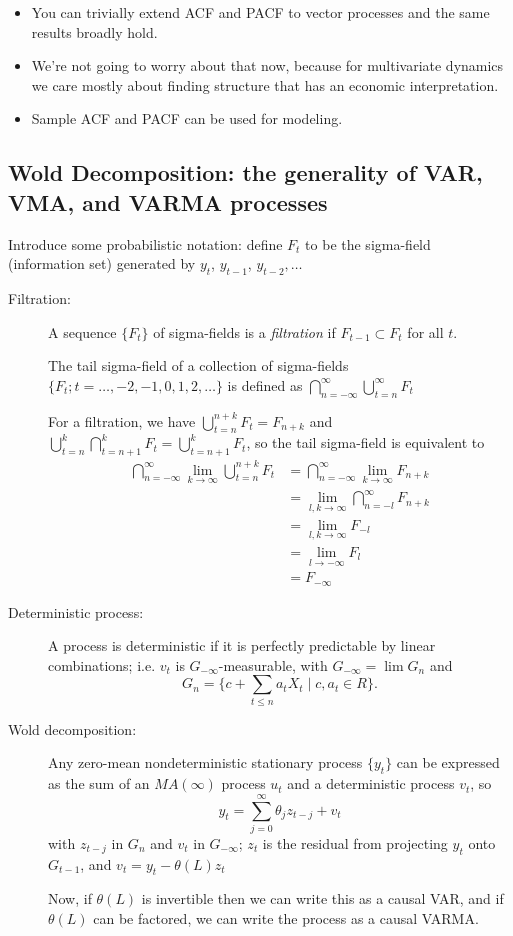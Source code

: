 \begin{itemize}
\item You can trivially extend ACF and PACF to vector processes and
  the same results broadly hold.
\item We're not going to worry about that now, because for
  multivariate dynamics we care mostly about finding structure that
  has an economic interpretation.
\item Sample ACF and PACF can be used for modeling.
\end{itemize}

\subsection{Wold Decomposition: the generality of VAR, VMA, and VARMA
  processes}

Introduce some probabilistic notation: define $F_t$ to be the sigma-field
(information set) generated by $y_t$, $y_{t-1}$, $y_{t-2},\dots$

\begin{description}
\item[Filtration:]
  A sequence $\{F_t\}$ of sigma-fields is a \emph{filtration} if
  $F_{t-1} ⊂ F_t$ for all $t$.

  The tail sigma-field of a collection of sigma-fields $\{F_t;
  t=\dots,-2,-1,0,1,2,\dots\}$ is defined as $\bigcap_{n=-\infty}^\infty \bigcup_{t=n}^\infty F_t$

  For a filtration, we have $\bigcup_{t=n}^{n+k} F_t = F_{n+k}$ and
  $\bigcup_{t=n}^k \bigcap_{t=n+1}^k F_t = \bigcup_{t=n+1}^k F_t$, so the tail
  sigma-field is equivalent to
  \begin{align}
    \bigcap_{n=-\infty}^\infty \lim_{k \to \infty} \bigcup_{t=n}^{n+k} F_t
    &= \bigcap_{n=-\infty}^\infty \lim_{k \to \infty} F_{n+k} \\
    &= \lim_{l,k \to \infty} \bigcap_{n=-l}^\infty F_{n+k} \\
    &= \lim_{l,k \to \infty} F_{-l} \\
    &= \lim_{l \to -\infty} F_l \\
    &= F_{-\infty}
  \end{align}

\item[Deterministic process:]
  A process is deterministic if it is perfectly predictable by linear
  combinations; i.e. $v_t$ is $G_{-\infty}$-measurable, with $G_{-\infty} = \lim
  G_n$ and
  \[G_n = \{c + \sum_{t \leq n} a_t X_t ∣ c, a_t \in R\}.\]
\item[Wold decomposition:]
Any zero-mean nondeterministic stationary process $\{y_t\}$ can be
expressed as the sum of an $MA(\infty)$ process $u_t$ and a deterministic
process $v_t$, so
\[y_t = \sum_{j=0}^\infty \theta_j z_{t-j} + v_t\]
with $z_{t-j}$ in $G_n$ and $v_t$ in $G_{-\infty}$; $z_t$ is the residual
from projecting $y_t$ onto $G_{t-1}$, and $v_t = y_t - \theta(L) z_t$

Now, if $\theta(L)$ is invertible then we can write this as a causal VAR,
and if $\theta(L)$ can be factored, we can write the process as a causal
VARMA.
\end{description}

